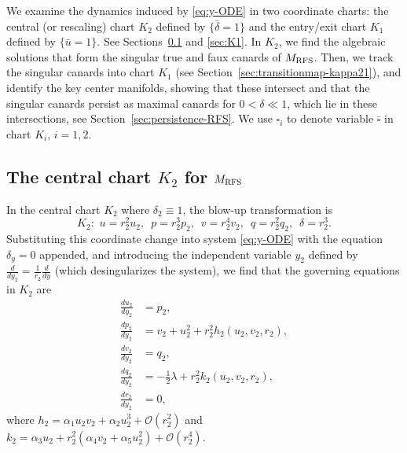 \documentclass[11pt]{article}
\numberwithin{equation}{section}
\begin{document}
We examine the dynamics induced by \eqref{eq:y-ODE} in two coordinate charts:
the central (or rescaling) chart $K_2$ defined by $\{\bar{\delta}=1\}$ and 
the entry/exit chart $K_1$ defined by $\{ \bar{u}=1 \}$.
See Sections~\ref{sec:K2} and \ref{sec:K1}.
In $K_2$, we find the algebraic solutions that form the singular true and faux canards of $M_{\rm RFS}$.
Then, we track the singular canards into chart $K_1$ (see Section~\ref{sec:transitionmap-kappa21}), and identify the key center manifolds, showing that these intersect and that the singular canards persist as maximal canards for $0<\delta \ll 1$, which lie in these intersections, see Section~\ref{sec:persistence-RFS}.
We use $\square_i$ to denote variable $\bar\square$ in chart $K_i$, $i=1,2$.

\subsection{The central chart \texorpdfstring{$K_2$ for $M_{\rm RFS}$}{Lg} } \label{sec:K2}
In the central chart $K_2$ where $\delta_2\equiv 1$, the blow-up transformation is
\begin{equation} \label{eq:K2-coords}
K_2: \, \, 
  u = r_2^2 u_2, \, \,  \,
  p = r_2^3 p_2, \, \,  \,
  v = r_2^4 v_2, \, \,  \, 
  q = r_2^2 q_2, \, \,  \,
  \delta=r_2^3.    
\end{equation}
Substituting this coordinate change into system \eqref{eq:y-ODE}
with the equation $\delta_y=0$ appended,
and introducing the independent variable $y_2$ defined 
by $\frac{d}{dy_2} = \frac{1}{r_2} \frac{d}{dy}$ (which desingularizes the system),
we find that the governing equations in $K_2$ are
\begin{equation} \label{eq:K2}
\begin{split}
    \frac{du_2}{dy_2} &= p_2, \\ 
    \frac{dp_2}{dy_2} &= v_2 + u_2^2 + r_2^2 h_2(u_2,v_2,r_2), \\
    \frac{dv_2}{dy_2} &= q_2, \\
    \frac{dq_2}{dy_2} &= -\frac{1}{2}\lambda + r_2^2 k_2(u_2,v_2,r_2),\\
    \frac{dr_2}{dy_2} &= 0,
\end{split}
\end{equation}
where $h_2= \alpha_1 u_2 v_2 + \alpha_2 u_2^3 + \mathcal{O}(r_2^2)$
and $k_2= \alpha_3 u_2 + r_2^2(\alpha_4 v_2 + \alpha_5 u_2^2) + \mathcal{O}(r_2^4)$.
\end{document}
